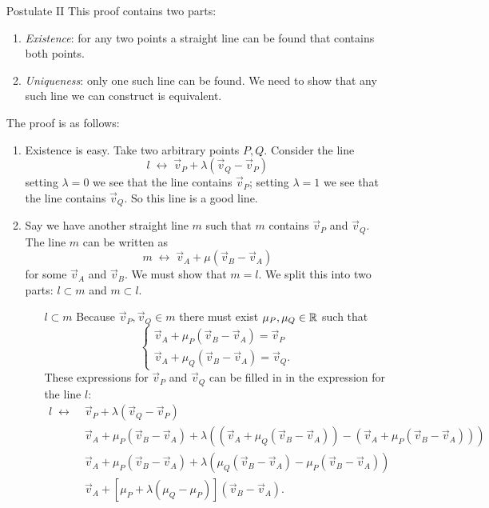 \begin{enumerate}
\item[Postulate II] This proof contains two parts:
\begin{enumerate}
\item \textit{Existence}: for any two points a straight line can be found that contains both points.
\item \textit{Uniqueness}: only one such line can be found. We need to show that any such line we can construct is equivalent.
\end{enumerate}
The proof is as follows:
\begin{enumerate}
\item Existence is easy. Take two arbitrary points $P,Q$. Consider the line
\[ l \;\leftrightarrow\; \vec{v}_P + \lambda (\vec{v}_Q - \vec{v}_P) \]
setting $\lambda = 0$ we see that the line contains $\vec{v}_P$; setting $\lambda = 1$ we see that the line contains $\vec{v}_Q$. So this line is a good line.
\item Say we have another straight line $m$ such that $m$ contains $\vec{v}_P$ and $\vec{v}_Q$. The line $m$ can be written as
\[ m \;\leftrightarrow\; \vec{v}_A + \mu (\vec{v}_B - \vec{v}_A)  \]
for some $\vec{v}_A$ and $\vec{v}_B$. We must show that $m = l$. We split this into two parts: $l \subset m$ and $m \subset l$.
\begin{enumerate}
\item[$\boxed{l \subset m}$] Because $\vec{v}_P, \vec{v}_Q \in m$ there must exist $\mu_P, \mu_Q \in \mathbb{R}$ such that
\begin{equation}
\begin{cases}
\vec{v}_A + \mu_P(\vec{v}_B - \vec{v}_A) = \vec{v}_P \\
\vec{v}_A + \mu_Q(\vec{v}_B - \vec{v}_A) = \vec{v}_Q.
\end{cases} \label{vPvQ}
\end{equation}
These expressions for $\vec{v}_P$ and $\vec{v}_Q$ can be filled in in the expression for the line $l$:
\begin{align}
l \;\leftrightarrow\; &\vec{v}_P + \lambda (\vec{v}_Q - \vec{v}_P) \\
&\vec{v}_A + \mu_P(\vec{v}_B - \vec{v}_A) + \lambda ((\vec{v}_A + \mu_Q(\vec{v}_B - \vec{v}_A)) - (\vec{v}_A + \mu_P(\vec{v}_B - \vec{v}_A))) \\
&\vec{v}_A + \mu_P(\vec{v}_B - \vec{v}_A) + \lambda (\mu_Q(\vec{v}_B - \vec{v}_A) - \mu_P(\vec{v}_B - \vec{v}_A)) \\
&\vec{v}_A + [\mu_P + \lambda(\mu_Q - \mu_P)](\vec{v}_B - \vec{v}_A).

\end{align}
\end{enumerate}
\end{enumerate}
\end{enumerate}
